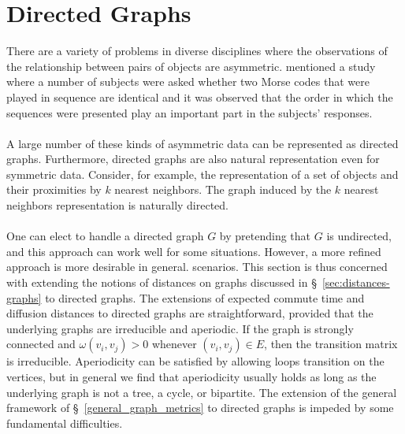 \documentclass[10pt,twocolumn]{article}
\numberwithin{equation}{section}
\begin{document}
\section{Directed Graphs}
\label{sec:dist-direct-graphs}
There are a variety of problems in diverse disciplines where the
observations of the relationship between pairs of objects are
asymmetric. \cite{rothkopf57} mentioned a study where a number of
subjects were asked whether two Morse codes that were played in
sequence are identical and it was observed that the order in which the
sequences were presented play an important part in the subjects'
responses. \\ \\
\noindent
A large number of these kinds of asymmetric data can be represented as
directed graphs. Furthermore, directed graphs are also natural
representation even for symmetric data. Consider, for example, the
representation of a set of objects and their proximities by $k$
nearest neighbors. The graph induced by the $k$ nearest neighbors
representation is naturally directed. \\ \\
%
\noindent
One can elect to handle a directed graph $G$ by pretending that $G$ is
undirected, and this approach can work well for some situations.
However, a more refined approach is more desirable in general.
scenarios.  This section is thus concerned with extending the notions
of distances on graphs discussed in \S~\ref{sec:distances-graphs} to
directed graphs. The extensions of expected commute time and diffusion
distances to directed graphs are straightforward, provided that the
underlying graphs are irreducible and aperiodic. If the graph is
strongly connected and $\omega(v_i,v_j) > 0$ whenever $(v_i,v_j) \in
E$, then the transition matrix is irreducible.  Aperiodicity can be
satisfied by allowing loops transition on the vertices, but in general
we find that aperiodicity usually holds as long as the underlying
graph is not a tree, a cycle, or bipartite.  The extension of the
general framework of \S~\ref{general_graph_metrics} to directed graphs
is impeded by some fundamental difficulties.
\end{document}
